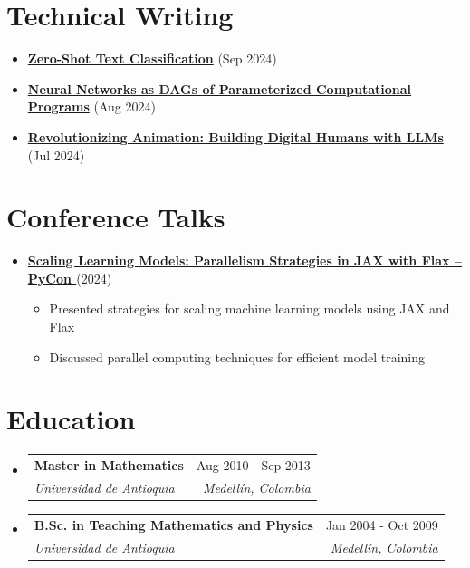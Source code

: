 \documentclass[letterpaper,11pt]{article}
\makeatletter
\newcommand{\resumeSubheading}[4]{
  \vspace{-2pt}
  \item[]
  \begin{tabular*}{\textwidth}{@{\extracolsep{\fill}}l r}
    \textbf{#1} & #2 \\
    \textit{#3} & \textit{#4} \\
  \end{tabular*}
  \vspace{-5pt}
}
\newcommand{\normalfaYoutube}{{\mdseries\faYoutube}}
\makeatother
\begin{document}
\section{Technical Writing}
\begin{itemize}[leftmargin=*, itemsep=0pt]
    \item \textbf{\href{https://www.asanchezyali.com/blog/en/ai/20240917ZeroShot}{Zero-Shot Text Classification}} (Sep 2024)
    \item \textbf{\href{https://www.asanchezyali.com/blog/en/differentiable-programming/20240923DifferentiablePrograms}{Neural Networks as DAGs of Parameterized Computational Programs}} (Aug 2024)
    \item \textbf{\href{https://www.asanchezyali.com/blog/en/ai-avatars/20240703DigitalHuman}{Revolutionizing Animation: Building Digital Humans with LLMs}} (Jul 2024)
\end{itemize}

\section{Conference Talks}
\begin{itemize}[leftmargin=*]
    \item \textbf{\href{https://www.youtube.com/watch?v=m4hP1soE414}{Scaling Learning Models: Parallelism Strategies in JAX with Flax -- PyCon \normalfaYoutube}} (2024)
    \begin{itemize}[itemsep=0pt]
        \item Presented strategies for scaling machine learning models using JAX and Flax
        \item Discussed parallel computing techniques for efficient model training
    \end{itemize}
\end{itemize}

\section{Education}
\begin{itemize}[leftmargin=0pt, itemindent=0pt, label={}]
\resumeSubheading
{Master in Mathematics}{Aug 2010 - Sep 2013}
{Universidad de Antioquia}{Medellín, Colombia}

\resumeSubheading
{B.Sc. in Teaching Mathematics and Physics}{Jan 2004 - Oct 2009}
{Universidad de Antioquia}{Medellín, Colombia}
\end{itemize}
\end{document}
